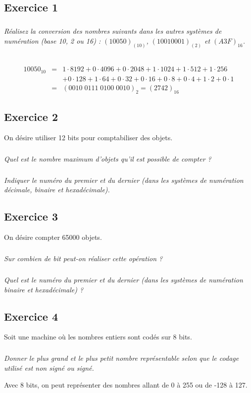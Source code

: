 \documentclass[10pt,fleqn]{article} %
\begin{document}
\begin{multicols}{2}
\footnotesize
\subsection*{Exercice 1}
\subparagraph*{}
\textit{Réalisez la conversion des nombres suivants dans les autres systèmes de numération (base 10, 2 ou 16) :
$(10050)_{(10)}$,
$(1001 0001)_{(2)}$ et 
$(A3F)_{16}$.}

\begin{corrige}
~\\

$$
\begin{array}{lcl}
10050_{10} &=& 
1 \cdot 8192 + 0 \cdot 4096 + 0 \cdot 2048 + 1 \cdot 1024 + 1 \cdot  512 + 1 \cdot 256 \\
&& + 0 \cdot 128 + 1 \cdot 64 + 0 \cdot 32 + 0 \cdot 16 + 0 \cdot 8 + 0 \cdot 4 + 1 \cdot 2 + 0 \cdot 1 \\
&=& \left(0010\;0111\;0100\;0010\right)_2 = (2742)_{16}
\end{array}
$$
\end{corrige}

\subsection*{Exercice 2}
On désire utiliser 12 bits pour comptabiliser des objets.
\subparagraph{}
\textit{Quel est le nombre maximum d'objets qu'il est possible de compter ?}
\subparagraph{}
\textit{Indiquer le numéro du premier et du dernier (dans les systèmes de numération décimale, binaire et hexadécimale).}


\subsection*{Exercice 3}
\setcounter{subparagraph}{0}

On désire compter 65000 objets. 
\subparagraph{}
\textit{Sur combien de bit peut-on réaliser cette opération ?}
\subparagraph{}
\textit{Quel est le numéro du premier et du dernier (dans les systèmes de numération binaire et hexadécimale) ?}


\subsection*{Exercice 4}
Soit une machine où les nombres entiers sont codés sur 8 bits.
\setcounter{subparagraph}{0}
\subparagraph{}
\textit{Donner le plus grand et le plus petit nombre représentable selon que le codage utilisé est non signé ou signé.}
\begin{corrige}
Avec 8 bits, on peut représenter des nombres allant de 0 à 255 ou de -128 à 127.


\end{corrige}
\end{multicols}
\end{document}
